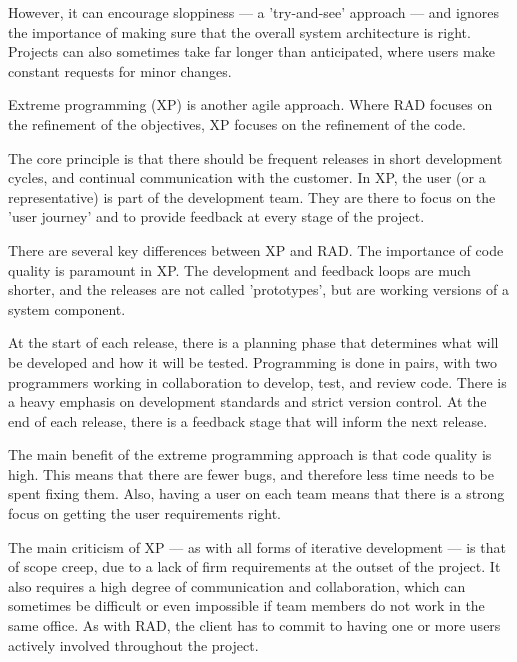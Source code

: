 \documentclass[../main.tex]{subfile}
\begin{document}
However, it can encourage sloppiness --- a 'try-and-see' approach --- and ignores the importance of making sure that the overall system architecture is right. Projects can also sometimes take far longer than anticipated, where users make constant requests for minor changes.


Extreme programming (XP) is another agile approach. Where RAD focuses on the refinement of the objectives, XP focuses on the refinement of the code.

The core principle is that there should be frequent releases in short development cycles, and continual communication with the customer. In XP, the user (or a representative) is part of the development team. They are there to focus on the 'user journey' and to provide feedback at every stage of the project.

There are several key differences between XP and RAD. The importance of code quality is paramount in XP. The development and feedback loops are much shorter, and the releases are not called 'prototypes', but are working versions of a system component.

At the start of each release, there is a planning phase that determines what will be developed and how it will be tested. Programming is done in pairs, with two programmers working in collaboration to develop, test, and review code. There is a heavy emphasis on development standards and strict version control. At the end of each release, there is a feedback stage that will inform the next release.

The main benefit of the extreme programming approach is that code quality is high. This means that there are fewer bugs, and therefore less time needs to be spent fixing them. Also, having a user on each team means that there is a strong focus on getting the user requirements right.

The main criticism of XP --- as with all forms of iterative development --- is that of scope creep, due to a lack of firm requirements at the outset of the project. It also requires a high degree of communication and collaboration, which can sometimes be difficult or even impossible if team members do not work in the same office. As with RAD, the client has to commit to having one or more users actively involved throughout the project.
\end{document}
